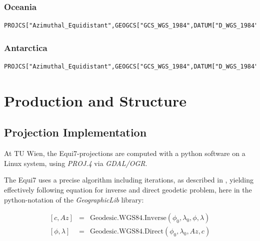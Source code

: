 \documentclass[11pt,a4paper]{article}
\begin{document}
\subsubsection*{Oceania}

\begin{lstlisting}
PROJCS["Azimuthal_Equidistant",GEOGCS["GCS_WGS_1984",DATUM["D_WGS_1984",SPHEROID["WGS_1984",6378137.0,298.257223563]],PRIMEM["Greenwich",0.0],UNIT["Degree",0.0174532925199433]],PROJECTION["Azimuthal_Equidistant"],PARAMETER["false_easting",5621452.01998],PARAMETER["false_northing",5990638.42298],PARAMETER["central_meridian",21.5],PARAMETER["latitude_of_origin",8.5],UNIT["Meter",1.0]]
\end{lstlisting}

\subsubsection*{Antarctica}

\begin{lstlisting}
PROJCS["Azimuthal_Equidistant",GEOGCS["GCS_WGS_1984",DATUM["D_WGS_1984",SPHEROID["WGS_1984",6378137.0,298.257223563]],PRIMEM["Greenwich",0.0],UNIT["Degree",0.0174532925199433]],PROJECTION["Azimuthal_Equidistant"],PARAMETER["false_easting",3714266.97719],PARAMETER["false_northing",3402016.50625],PARAMETER["central_meridian",0.0],PARAMETER["latitude_of_origin",-90.0],UNIT["Meter",1.0]]
\end{lstlisting}

\newpage

\section{Production and Structure}
\label{sec:production}

\subsection{Projection Implementation}
\label{sub:proj_impl}

At TU Wien, the Equi7-projections are computed with a python software on a Linux system, using \textit{PROJ.4} via \textit{GDAL/OGR}.

The Equi7 uses a precise algorithm including iterations, as described in \cite{Karney2013}, yielding effectively following equation for inverse and direct geodetic problem, here in the python-notation of the \textit{GeographicLib} library:

\begin{eqnarray}
\left[ c, \mathit{Az} \right] &=& \mathrm{Geodesic.WGS84.Inverse}(\phi_{0}, \lambda_{0}, \phi, \lambda) \\
\left[ \phi , \lambda \right] &=& \mathrm{Geodesic.WGS84.Direct}(\phi_{0}, \lambda_{0}, \mathit{Az}, c)
\end{eqnarray}
\end{document}
